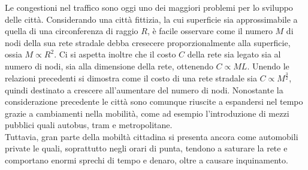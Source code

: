 \documentclass[../main.tex]{subfiles}
\begin{document}
Le congestioni nel traffico sono oggi uno dei maggiori problemi per lo sviluppo delle citt\`a.
Considerando una citt\`a fittizia, la cui superficie sia approssimabile a quella di una circonferenza di raggio $R$, \`e facile osservare come il numero $M$ di nodi della sua rete stradale debba cresecere proporzionalmente alla superficie, ossia $M\propto R^2$.
Ci si aspetta inoltre che il costo $C$ della rete sia legato sia al numero di nodi, sia alla dimensione della rete, ottenendo $C\propto ML$.
Unendo le relazioni precedenti si dimostra come il costo di una rete stradale sia $C\propto M^\frac{3}{2}$, quindi destinato a crescere all'aumentare del numero di nodi.
Nonostante la considerazione precedente le città sono comunque riuscite a espandersi nel tempo grazie a cambiamenti nella mobilit\`a, come ad esempio l'introduzione di mezzi pubblici quali autobus, tram e metropolitane.
\\Tuttavia, gran parte della mobiltà cittadina si presenta ancora come automobili private le quali, soprattutto negli orari di punta, tendono a saturare la rete e comportano enormi sprechi di tempo e denaro, oltre a causare inquinamento.
\end{document}
